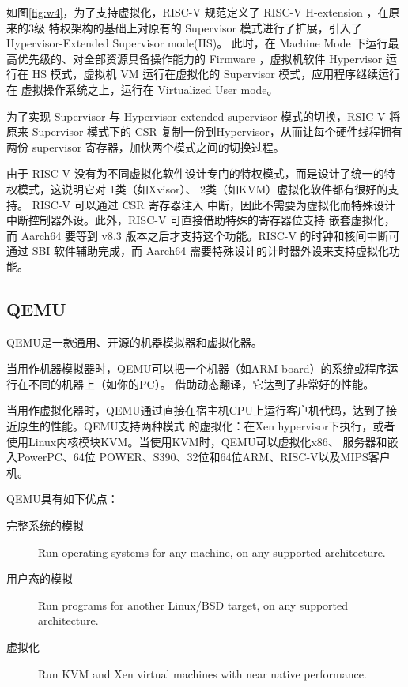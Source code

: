 \documentclass{../runikraft-report}
\begin{document}
如图\ref{fig:w4}，为了支持虚拟化，RISC-V 规范定义了 RISC-V H-extension ，在原来的3级
特权架构的基础上对原有的 Supervisor 模式进行了扩展，引入了 Hypervisor-Extended Supervisor mode(HS)。
此时，在 Machine Mode 下运行最高优先级的、对全部资源具备操作能力的 Firmware ，虚拟机软件
Hypervisor 运行在 HS 模式，虚拟机 VM 运行在虚拟化的 Supervisor 模式，应用程序继续运行在
虚拟操作系统之上，运行在 Virtualized User mode。

为了实现 Supervisor 与 Hypervisor-extended supervisor 模式的切换，RSIC-V 将原来
Supervisor 模式下的 CSR 复制一份到Hypervisor，从而让每个硬件线程拥有两份 supervisor
寄存器，加快两个模式之间的切换过程。

由于 RISC-V 没有为不同虚拟化软件设计专门的特权模式，而是设计了统一的特权模式，这说明它对
1类（如Xvisor）、 2类（如KVM）虚拟化软件都有很好的支持。 RISC-V 可以通过 CSR 寄存器注入
中断，因此不需要为虚拟化而特殊设计中断控制器外设。此外，RISC-V 可直接借助特殊的寄存器位支持
嵌套虚拟化，而 Aarch64 要等到 v8.3 版本之后才支持这个功能。RISC-V 的时钟和核间中断可通过
SBI 软件辅助完成，而 Aarch64 需要特殊设计的计时器外设来支持虚拟化功能。\cite{d}

\subsection{QEMU}

QEMU是一款通用、开源的机器模拟器和虚拟化器。

当用作机器模拟器时，QEMU可以把一个机器（如ARM board）的系统或程序运行在不同的机器上（如你的PC）。
借助动态翻译，它达到了非常好的性能。

当用作虚拟化器时，QEMU通过直接在宿主机CPU上运行客户机代码，达到了接近原生的性能。QEMU支持两种模式
的虚拟化：在Xen hypervisor下执行，或者使用Linux内核模块KVM。当使用KVM时，QEMU可以虚拟化x86、
服务器和嵌入PowerPC、64位 POWER、S390、32位和64位ARM、RISC-V\cite{qemu7}以及MIPS客户机。\cite{1}

\noindent QEMU具有如下优点：

\begin{description}
\item[完整系统的模拟] Run operating systems for any machine, on any supported architecture.
\item[用户态的模拟] Run programs for another Linux/BSD target, on any supported architecture.
\item[虚拟化] Run KVM and Xen virtual machines with near native performance.\cite{1}
\end{description}
\end{document}
